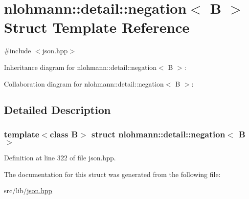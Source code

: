 \hypertarget{structnlohmann_1_1detail_1_1negation}{}\section{nlohmann\+:\+:detail\+:\+:negation$<$ B $>$ Struct Template Reference}
\label{structnlohmann_1_1detail_1_1negation}


{\ttfamily \#include $<$json.\+hpp$>$}



Inheritance diagram for nlohmann\+:\+:detail\+:\+:negation$<$ B $>$\+:


Collaboration diagram for nlohmann\+:\+:detail\+:\+:negation$<$ B $>$\+:


\subsection{Detailed Description}
\subsubsection*{template$<$class B$>$\newline
struct nlohmann\+::detail\+::negation$<$ B $>$}



Definition at line 322 of file json.\+hpp.



The documentation for this struct was generated from the following file\+:\begin{DoxyCompactItemize}
\item 
src/lib/\hyperlink{json_8hpp}{json.\+hpp}\end{DoxyCompactItemize}
